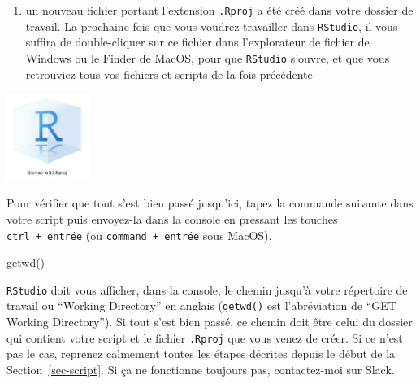 \documentclass[
  a4paper,
  DIV=11,
  numbers=noendperiod,
  oneside]{scrreprt}
\newenvironment{Shaded}{}{}
\newcommand{\FunctionTok}[1]{\textcolor[rgb]{0.44,0.26,0.76}{#1}}
\newcommand{\NormalTok}[1]{\textcolor[rgb]{0.14,0.16,0.18}{#1}}
\providecommand{\tightlist}{%
  \setlength{\itemsep}{0pt}\setlength{\parskip}{0pt}}\usepackage{longtable,booktabs,array}
\begin{document}
\begin{enumerate}
\def\labelenumi{\arabic{enumi}.}
\setcounter{enumi}{2}
\tightlist
\item
  un nouveau fichier portant l'extension \texttt{.Rproj} a été créé dans
  votre dossier de travail. La prochaine fois que vous voudrez
  travailler dans \texttt{RStudio}, il vous suffira de double-cliquer
  sur ce fichier dans l'explorateur de fichier de Windows ou le Finder
  de MacOS, pour que \texttt{RStudio} s'ouvre, et que vous retrouviez
  tous vos fichiers et scripts de la fois précédente
\end{enumerate}

\begin{center}
\includegraphics[width=0.2\textwidth,height=\textheight]{images/Rproj3.png}
\end{center}

Pour vérifier que tout s'est bien passé jusqu'ici, tapez la commande
suivante dans votre script puis envoyez-la dans la console en pressant
les touches \texttt{ctrl\ +\ entrée} (ou \texttt{command\ +\ entrée}
sous MacOS).

\begin{Shaded}
\begin{Highlighting}[]
\FunctionTok{getwd}\NormalTok{()}
\end{Highlighting}
\end{Shaded}

\texttt{RStudio} doit vous afficher, dans la console, le chemin jusqu'à
votre {répertoire de travail} ou ``Working Directory'' en anglais
(\texttt{getwd()} est l'abréviation de ``GET Working Directory''). Si
tout s'est bien passé, ce chemin doit être celui du dossier qui contient
votre script et le fichier \texttt{.Rproj} que vous venez de créer. Si
ce n'est pas le cas, reprenez calmement toutes les étapes décrites
depuis le début de la Section~\ref{sec-script}. Si ça ne fonctionne
toujours pas, contactez-moi sur Slack.
\end{document}
